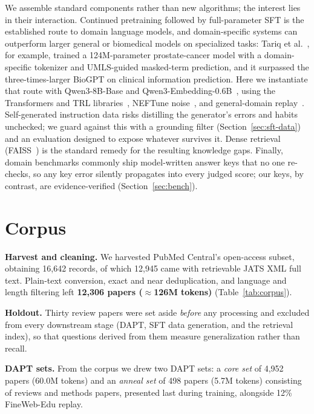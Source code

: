 \documentclass[11pt]{article}
\begin{document}
We assemble standard components rather than new algorithms; the
interest lies in their interaction. Continued pretraining followed by
full-parameter SFT is the established route to domain language models,
and domain-specific systems can outperform larger general
or biomedical models on specialized tasks: Tariq et
al.~\cite{tariq2024}, for example, trained a 124M-parameter
prostate-cancer model with a domain-specific tokenizer and UMLS-guided
masked-term prediction, and it surpassed the three-times-larger BioGPT
on clinical information prediction. Here we instantiate that route
with Qwen3-8B-Base and Qwen3-Embedding-0.6B~\cite{qwen3}, using the
Transformers and TRL libraries~\cite{transformers,trl}, NEFTune
noise~\cite{neftune}, and general-domain replay~\cite{fineweb}.
Self-generated instruction data risks distilling the generator's errors
and habits unchecked; we guard against this with a grounding filter
(Section~\ref{sec:sft-data}) and an evaluation designed to expose
whatever survives it. Dense retrieval (FAISS~\cite{faiss}) is the
standard remedy for the resulting knowledge gaps. Finally, domain
benchmarks commonly ship model-written answer keys that no one
re-checks, so any key error silently propagates into every judged
score; our keys, by contrast, are evidence-verified
(Section~\ref{sec:bench}).

\section{Corpus}
\label{sec:corpus}

\textbf{Harvest and cleaning.} We harvested PubMed Central's
open-access subset, obtaining 16,642 records, of which 12,945 came
with retrievable JATS XML full text. Plain-text conversion, exact and near
deduplication, and language and length filtering left \textbf{12,306
papers ($\approx$126M tokens)} (Table~\ref{tab:corpus}).

\textbf{Holdout.} Thirty review papers were set aside \emph{before}
any processing and excluded from every downstream stage (DAPT, SFT
data generation, and the retrieval index), so that questions derived
from them measure generalization rather than recall.

\textbf{DAPT sets.} From the corpus we drew two DAPT sets: a
\emph{core set} of 4,952 papers (60.0M tokens) and an \emph{anneal set}
of 498 papers (5.7M tokens) consisting of reviews and methods papers,
presented last during training, alongside 12\% FineWeb-Edu replay.
\end{document}
